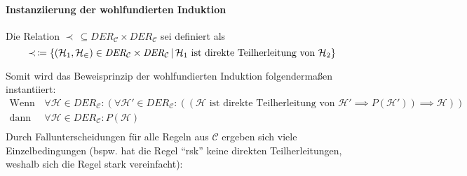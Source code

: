			    \paragraph{Instanziierung der wohlfundierten Induktion}
				    Die Relation $ \prec \,\subseteq \textit{DER} _ \mathcal{C} \times \textit{DER} _ \mathcal{C} $ sei definiert als \[ \prec \,\coloneqq \{ (\mathcal{H} _ 1, \mathcal{H _ 2}) \in \textit{DER} _ \mathcal{C} \times \textit{DER} _ \mathcal{C} \,\vert\, \mathcal{H} _ 1 \text{ ist direkte Teilherleitung von } \mathcal{H} _ 2 \} \]
				    
				    Somit wird das Beweisprinzip der wohlfundierten Induktion folgendermaßen instantiiert:
				    \begin{align*}
					    \text{Wenn gilt:} & \,\forall \mathcal{H} \in \textit{DER} _ \mathcal{C} : (\forall \mathcal{H}' \in \textit{DER} _ \mathcal{C} : ((\mathcal{H} \text{ ist direkte Teilherleitung von } \mathcal{H}' \implies P(\mathcal{H}')) \implies \mathcal{H})) \\
					    \text{dann gilt:} & \,\forall \mathcal{H} \in \textit{DER} _ \mathcal{C} : P(\mathcal{H}) \\
				    \end{align*}
				    Durch Fallunterscheidungen für alle Regeln aus $ \mathcal{C} $ ergeben sich viele Einzelbedingungen (bspw. hat die Regel \enquote{rsk} keine direkten Teilherleitungen, weshalb sich die Regel stark vereinfacht):
